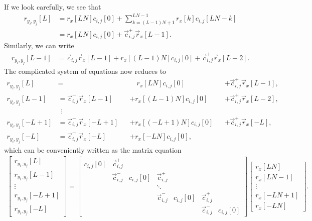 \documentclass[a4paper, openany, oneside]{memoir}
\begin{document}
If we look carefully, we see that
\begin{align*}
    r_{y_i,y_j}[L] &= r_x[LN]c_{i,j}[0] + \sum_{k=(L-1)N+1}^{LN-1}r_x[k]c_{i,j}[LN-k] \\
    &=r_x[LN]c_{i,j}[0] + \vec{c}_{i,j}^+ \vec{r}_x[L-1].
\end{align*}
Similarly, we can write
\begin{align*}
    r_{y_i,y_j}[L-1] &= \vec{c}_{i,j}^{-} \vec{r}_x[L-1] + r_x[(L-1)N] c_{i,j}[0] + \vec{c}_{i,j}^{+} \vec{r}_x[L-2].
\end{align*}
The complicated system of equations now reduces to
\begin{align*}
    r_{y_i,y_j}[L] &= &&\hspace{12pt}r_x[LN] c_{i,j}[0] &&+ \vec{c}_{i,j}^+ \vec{r}_x[L-1] , \\
    r_{y_i,y_j}[L-1] &= \vec{c}_{i,j}^{-} \vec{r}_x[L-1] &&+ r_x[(L-1)N] c_{i,j}[0] &&+ \vec{c}_{i,j}^{+} \vec{r}_x[L-2], \\
    &~~\vdots \\
    r_{y_i,y_j}[-L+1] &= \vec{c}_{i,j}^{-}\vec{r}_x[-L+1] &&+ r_x[(-L+1)N] c_{i,j}[0] &&+ \vec{c}_{i,j}^{+}\vec{r}_x[-L], \\
    r_{y_i,y_j}[-L] &= \vec{c}_{i,j}^{-} \vec{r}_x[-L] &&+ r_x[-LN] c_{i,j}[0],
\end{align*}
which can be conveniently written as the matrix equation
\begin{align*}
    \begin{bmatrix}
        r_{y_i,y_j}[L] \\
        r_{y_i,y_j}[L-1] \\
        \vdots \\
        r_{y_i,y_j}[-L+1] \\
        r_{y_i,y_j}[-L]
    \end{bmatrix} = \begin{bmatrix}
        c_{i,j}[0] & \vec{c}^+_{i,j} \\
        & \vec{c}^{-}_{i,j} & c_{i,j}[0] & \vec{c}^{+}_{i,j} \\
        &&&\ddots \\
        &&&\vec{c}^{-}_{i,j} & c_{i,j}[0] & \vec{c}^{+}_{i,j} \\
        &&&&&\vec{c}^{-}_{i,j} & c_{i,j}[0]
    \end{bmatrix} \begin{bmatrix}
        r_x[LN] \\
        r_x[LN-1] \\
        \vdots \\
        r_x[-LN+1] \\
        r_x[-LN]
    \end{bmatrix}.
\end{align*}
\end{document}

